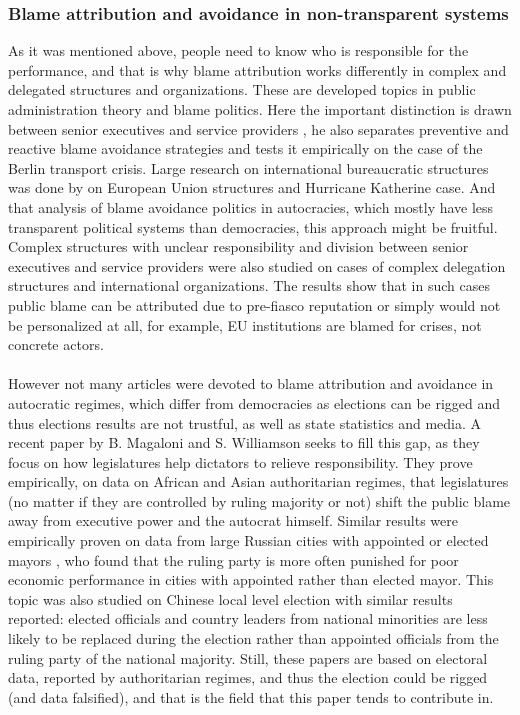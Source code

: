 \documentclass[a4paper, 12pt]{article}
\begin{document}
	\subsubsection*{Blame attribution and avoidance in non-transparent systems}
	As it was mentioned above, people need to know who is responsible for the performance, and that is why blame attribution works differently in complex and delegated structures and organizations. These are developed topics in public administration theory and blame politics. Here the important distinction is drawn between senior executives and service providers \cite{complex}, he also separates preventive and reactive blame avoidance strategies and tests it empirically on the case of the Berlin transport crisis. Large research on international bureaucratic structures was done by \cite{Rittberger2017, Bovens2007} on European Union structures and Hurricane Katherine case. And that analysis of blame avoidance politics in autocracies, which mostly have less transparent political systems than democracies, this approach might be fruitful. Complex structures with unclear responsibility and division between senior executives and service providers were also studied \parencite{Moynihan2012} on cases of complex delegation structures and international organizations. The results show that in such cases public blame can be attributed due to pre-fiasco reputation or simply would not be personalized at all, for example, EU institutions are blamed for crises, not concrete actors.
    \\\\
	However not many articles were devoted to blame attribution and avoidance in autocratic regimes, which differ from democracies as elections can be rigged and thus elections results are not trustful, as well as state statistics and media. A recent paper by B. Magaloni and S. Williamson \parencite{legislaturesandblame} seeks to fill this gap, as they focus on how legislatures help dictators to relieve responsibility. They prove empirically, on data on African and Asian authoritarian regimes, that legislatures (no matter if they are controlled by ruling majority or not) shift the public blame away from executive power and the autocrat himself. Similar results were empirically proven on data from large Russian cities with appointed or elected mayors \parencite{autocblame}, who found that the ruling party is more often punished for poor economic performance in cities with appointed rather than elected mayor. This topic was also studied on Chinese local level election \parencite{chinablame} with similar results reported: elected officials and country leaders from national minorities are less likely to be replaced during the election rather than appointed officials from the ruling party of the national majority. Still, these papers are based on electoral data, reported by authoritarian regimes, and thus the election could be rigged (and data falsified), and that is the field that this paper tends to contribute in.
\end{document}
